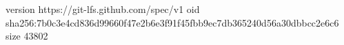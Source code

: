 version https://git-lfs.github.com/spec/v1
oid sha256:7b0c3e4cd836d99660f47e2b6e3f91f45fbb9ec7db365240d56a30dbbcc2e6c6
size 43802
